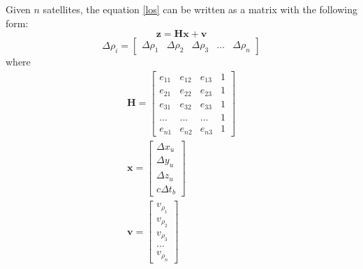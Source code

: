 Given $n$ satellites, the equation \eqref{los} can be written as a matrix with the following form:
\begin{equation}
	\textbf{z} = \textbf{Hx}+ \textbf{v}
\end{equation}
\begin{equation}
	\Delta \rho _i = \begin{bmatrix}
		\Delta \rho_1 &  \Delta \rho_2 &  \Delta \rho_3 & ... & \Delta \rho_n
	\end{bmatrix} 
\end{equation}
where 
\begin{subequations}
	\begin{align}
		\textbf{H} = \begin{bmatrix}
			e_{11} & e_{12} & e_{13}& 1 \\
			e_{21} & e_{22} & e_{23}& 1 
			\\
			e_{31} & e_{32} & e_{33}& 1
			\\
			... & ... & ... &  1 
			\\
			e_{n1} & e_{n2} & e_{n3} & 1
		\end{bmatrix}\\
		\textbf{x} = \begin{bmatrix}
			\Delta x_u \\ \Delta y_u \\\Delta z_u \\ c\Delta t_b
		\end{bmatrix}\\
		\textbf{v} = \begin{bmatrix}
			v_{\rho_1}\\
			v_{\rho_2}\\
			v_{\rho_3}\\
			...\\
			v_{\rho_n}
		\end{bmatrix}
	\end{align}
\end{subequations}

